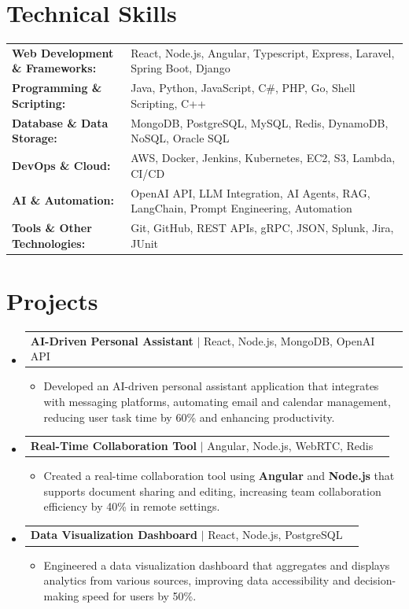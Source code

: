 \documentclass[letterpaper,10pt]{article}
\makeatletter
\newcommand{\resumeItem}[1]{
  \item{\fontsize{8pt}{9pt}\selectfont
    #1 \vspace{-3pt}
  }
}
\newcommand{\resumeProjectHeading}[2]{
    \item
    \begin{tabular*}{1.001\textwidth}{l@{\extracolsep{\fill}}r}
      \fontsize{8.5pt}{10pt}#1 & \textbf{\fontsize{8.5pt}{10pt} #2}\\
    \end{tabular*}\vspace{-7pt}
}
\newcommand{\resumeSubHeadingListStart}{\begin{itemize}[leftmargin=0pt, label={}]}
\newcommand{\resumeSubHeadingListEnd}{\end{itemize}}
\newcommand{\resumeItemListStart}{\begin{itemize}[leftmargin=*]}
\newcommand{\resumeItemListEnd}{\end{itemize}\vspace{-5pt}}
\makeatother
\begin{document}
\section{Technical Skills}
        \vspace{-14pt}
        \begin{table}[h]
            \fontsize{8pt}{9pt}\selectfont
            \begin{tabular}{p{0.3\linewidth} p{0.7\linewidth}}
                \textbf{Web Development \& Frameworks:} & React, Node.js, Angular, Typescript, Express, Laravel, Spring Boot, Django \\
                \textbf{Programming \& Scripting:} & Java, Python, JavaScript, C\#, PHP, Go, Shell Scripting, C++ \\
                \textbf{Database \& Data Storage:} & MongoDB, PostgreSQL, MySQL, Redis, DynamoDB, NoSQL, Oracle SQL \\
                \textbf{DevOps \& Cloud:} & AWS, Docker, Jenkins, Kubernetes, EC2, S3, Lambda, CI/CD \\
                \textbf{AI \& Automation:} & OpenAI API, LLM Integration, AI Agents, RAG, LangChain, Prompt Engineering, Automation \\
                \textbf{Tools \& Other Technologies:} & Git, GitHub, REST APIs, gRPC, JSON, Splunk, Jira, JUnit \\
            \end{tabular}
        \end{table}
 \vspace{-18pt}

\section{Projects}
    \vspace{-5pt}
    \resumeSubHeadingListStart
          \resumeProjectHeading
            {\textbf{AI-Driven Personal Assistant} $|$ React, Node.js, MongoDB, OpenAI API}{}
            \resumeItemListStart
                \resumeItem{Developed an AI-driven personal assistant application that integrates with messaging platforms, automating email and calendar management, reducing user task time by 60\% and enhancing productivity.}
            \resumeItemListEnd
        \vspace{-12pt}
    
        \resumeProjectHeading
            {\textbf{Real-Time Collaboration Tool} $|$ Angular, Node.js, WebRTC, Redis}{}
        \resumeItemListStart
                \resumeItem{Created a real-time collaboration tool using \textbf{Angular} and \textbf{Node.js} that supports document sharing and editing, increasing team collaboration efficiency by 40\% in remote settings.}
        \resumeItemListEnd
      \vspace{-12pt}
      \resumeProjectHeading
        {\textbf{Data Visualization Dashboard} $|$ React, Node.js, PostgreSQL}{}
    \resumeItemListStart
            \resumeItem{Engineered a data visualization dashboard that aggregates and displays analytics from various sources, improving data accessibility and decision-making speed for users by 50\%.}
    \resumeItemListEnd
    \resumeSubHeadingListEnd
\end{document}
